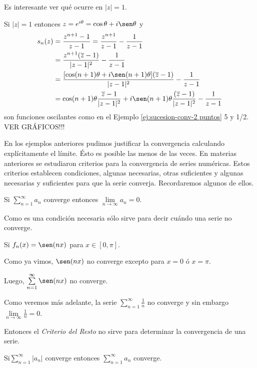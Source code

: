 Es interesante ver qué ocurre en $|z|=1$. 

Si $|z|=1$ entonces $z=e^{i\theta}=\cos \theta +i \sen \theta$ y 
\[
\begin{split}
s_n(z)&=
\frac{z^{n+1}-1}{z-1}=
\frac{z^{n+1}}{z-1}-\frac{1}{z-1}
\\
&=\frac{z^{n+1}(\overline z-1)}{|z-1|^2}-\frac{1}{z-1}
\\
&=\frac{ [\cos(n+1)\theta+i\sen(n+1)\theta](\overline z-1)}{|z-1|^2}-\frac{1}{z-1}
\\
&=\cos(n+1)\theta \frac{\overline z-1}{|z-1|^2}+i \sen(n+1)\theta \frac{(\overline z-1)}{|z-1|^2}-\frac{1}{z-1}
\end{split}
\]
son funciones oscilantes como en el Ejemplo \ref{ej:sucesion-conv-2 puntos} 5 y 1/2. VER GRÁFICOS!!!

En los ejemplos anteriores pudimos justificar la convergencia calculando explícitamente el límite. 
Ésto es posible las menos de las veces. En materias anteriores se estudiaron criterios para la 
convergencia de series  numéricas. Estos criterios establecen condiciones, algunas necesarias, otras 
suficientes y algunas necesarias y suficientes para que la serie converja. Recordaremos algunos de ellos.

\begin{teorema}{}
Si  $\sum\limits_{n=1}^{\infty} a_n$ converge entonces $\lim\limits_{n \to \infty} a_n=0$.
\end{teorema}

Como es una condición  necesaria sólo sirve para decir cuándo una serie no converge.

\begin{ejemplo}{}
Si $f_n(x)= \sen(nx)$ para $x \in [0,\pi]$. 

Como ya vimos, $\sen(nx)$ no converge excepto para $x=0$ \'o $x=\pi$. 

Luego, $\sum\limits_{n=1}^{\infty} \sen(nx)$ no converge.
\end{ejemplo}

Como veremos más adelante, la serie $\sum\limits_{n=1}^{\infty}\frac{1}{n}$ no converge y sin embargo
$\lim\limits_{n \to \infty}\frac{1}{n}=0$. 

Entonces el \textit{Criterio del Resto} no sirve para determinar
la convergencia de una serie.

\begin{teorema}{}
Si$\sum\limits_{n=1}^{\infty} |a_n|$ converge entonces $\sum\limits_{n=1}^{\infty} a_n$ converge.
\end{teorema}

